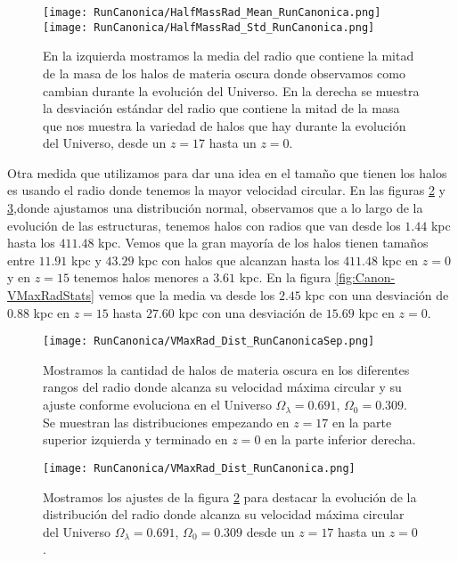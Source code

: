\begin{figure}[H]
    \centering
    \texttt{[image: RunCanonica/HalfMassRad\_Mean\_RunCanonica.png]}
    \texttt{[image: RunCanonica/HalfMassRad\_Std\_RunCanonica.png]}
    \caption[Media y desviación estándar del radio de la mitad de la masa]{\footnotesize En la izquierda mostramos la media del radio que contiene la mitad de la masa de los halos de materia oscura donde observamos como cambian durante la evolución del Universo. En la derecha se muestra la desviación estándar del radio que contiene la mitad de la masa que nos muestra la variedad de halos que hay durante la evolución del Universo, desde un $z=17$ hasta un $z=0$.}
    \label{fig:Canon-HalfMassRadStats}
\end{figure}

Otra medida que utilizamos para dar una idea en el tamaño que tienen los halos es usando el radio donde tenemos la mayor velocidad circular. En las figuras \ref{fig:Canon-VMaxRadDistSep} y \ref{fig:Canon-VMaxRadDist},{\morado donde ajustamos una distribución normal,} observamos que a lo largo de la evolución de las estructuras, tenemos halos con radios que van desde los $1.44$ kpc hasta los $411.48$ kpc. Vemos que la gran mayoría de los halos tienen tamaños entre $11.91$ kpc y $43.29$ kpc con halos que alcanzan hasta los $411.48$ kpc en $z=0$ y en $z=15$ tenemos halos menores a $3.61$ kpc. En la figura \ref{fig:Canon-VMaxRadStats} vemos que la media va desde los $2.45$ kpc con una desviación de $0.88$ kpc en $z=15$ hasta $27.60$ kpc con una desviación de $15.69$ kpc en $z=0$.

\begin{figure}[H]
    \centering
    \texttt{[image: RunCanonica/VMaxRad\_Dist\_RunCanonicaSep.png]}
    \caption[Radio donde se alcanza la velocidad máxima circular]{\footnotesize Mostramos la cantidad de halos de materia oscura en los diferentes rangos del radio donde alcanza su velocidad máxima circular y su ajuste conforme evoluciona en el Universo $\Omega_\lambda = 0.691 $, $\Omega_0 = 0.309$. Se muestran las distribuciones empezando en $z=17$ en la parte superior izquierda y terminado en $z=0$ en la parte inferior derecha.}
    \label{fig:Canon-VMaxRadDistSep}
\end{figure}

\begin{figure}[H]
    \centering
    \texttt{[image: RunCanonica/VMaxRad\_Dist\_RunCanonica.png]}
    \caption[Distribución del radio donde se alcanza la velocidad máxima circular]{\footnotesize Mostramos los ajustes de la figura \ref{fig:Canon-VMaxRadDistSep} para destacar la evolución de la distribución del radio donde alcanza su velocidad máxima circular del Universo $\Omega_\lambda = 0.691 $, $\Omega_0 = 0.309$ desde un $z=17$ hasta un $z=0$.}
    \label{fig:Canon-VMaxRadDist}
\end{figure}

